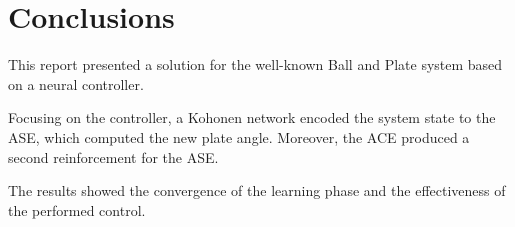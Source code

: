 
\section{Conclusions}
\label{sec:conclusions}

This report presented a solution for the well-known Ball and Plate system
based on a neural controller.

Focusing on the controller, a Kohonen network encoded the system state to the
ASE, which computed the new plate angle. Moreover, the ACE produced a second
reinforcement for the ASE.

The results showed the convergence of the learning phase and the effectiveness
of the performed control.



